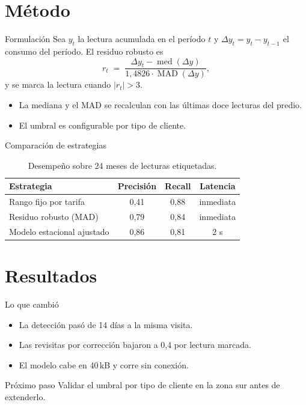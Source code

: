 \documentclass[11pt,aspectratio=169]{beamer}
\begin{document}
\section{Método}


\begin{frame}{Formulación}
  Sea $y_t$ la lectura acumulada en el período $t$ y $\Delta y_t = y_t - y_{t-1}$
  el consumo del período. El residuo robusto es
  \[
    r_t \;=\; \frac{\Delta y_t - \operatorname{med}(\Delta y)}{1{,}4826 \cdot \operatorname{MAD}(\Delta y)},
  \]
  y se marca la lectura cuando $|r_t| > 3$.

  \begin{itemize}
    \item La mediana y el MAD se recalculan con las últimas doce lecturas del predio.
    \item El umbral es configurable por tipo de cliente.
  \end{itemize}
\end{frame}

\begin{frame}{Comparación de estrategias}
  \begin{table}
    \centering
    \small
    \begin{tabular}{@{}lccc@{}}
      \toprule
      Estrategia & Precisión & Recall & Latencia \\
      \midrule
      Rango fijo por tarifa      & 0,41 & 0,88 & inmediata \\
      Residuo robusto (MAD)      & 0,79 & 0,84 & inmediata \\
      Modelo estacional ajustado & 0,86 & 0,81 & 2 s \\
      \bottomrule
    \end{tabular}
    \caption{Desempeño sobre 24 meses de lecturas etiquetadas.}
  \end{table}
\end{frame}

\section{Resultados}

\begin{frame}{Lo que cambió}
  \begin{itemize}\usachaire
    \item La detección pasó de 14 días a la misma visita.
    \item Las revisitas por corrección bajaron a 0,4 por lectura marcada.
    \item El modelo cabe en 40\,kB y corre sin conexión.
  \end{itemize}
  \vfill
  \begin{block}{Próximo paso}
    Validar el umbral por tipo de cliente en la zona sur antes de extenderlo.
  \end{block}
\end{frame}
\end{document}
